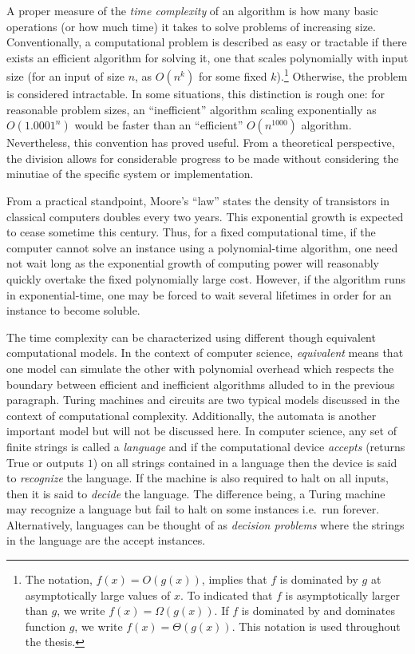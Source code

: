 \documentclass[11pt,oneside,final]{huthesis}%
\begin{document}
A proper measure of the \emph{time complexity} of an algorithm is how many basic operations (or how much time) it takes to solve problems of increasing size. Conventionally, a computational problem is described as easy or tractable if there exists an efficient algorithm for solving it, one that scales polynomially with input size (for an input of size $n$, as $O(n^k)$ for some fixed $k$).\footnote{The notation, $f(x)=O(g(x))$, implies that $f$ is dominated by $g$ at asymptotically large values of $x$.  To indicated that $f$ is asymptotically larger than $g$, we write $f(x)=\Omega(g(x))$.  If $f$ is dominated by and dominates function $g$, we write $f(x)=\Theta(g(x))$. This notation is used throughout the thesis.} Otherwise, the problem is considered intractable. In some situations, this distinction is rough one: for reasonable problem sizes, an ``inefficient'' algorithm scaling exponentially as $O(1.0001^n)$ would be faster than an ``efficient'' $O(n^{1000})$ algorithm. Nevertheless, this convention has proved useful. From a theoretical perspective, the division allows for considerable progress to be made without considering the minutiae of the specific system or implementation.

From a practical standpoint, Moore's ``law'' states the density of transistors in classical computers doubles every two years.  This exponential growth is expected to cease sometime this century.  Thus, for a fixed computational time, if the computer cannot solve an instance using a polynomial-time algorithm, one need not wait long as the exponential growth of computing power will reasonably quickly  overtake the fixed polynomially large cost.  However, if the algorithm runs in exponential-time, one may be forced to wait several lifetimes in order for an instance to become soluble.  



The time complexity can be characterized using different though equivalent computational models.  In the context of computer science, \emph{equivalent} means that one model can simulate the other with polynomial overhead which respects the boundary between efficient and inefficient algorithms alluded to in the previous paragraph.  Turing machines and circuits are two typical models discussed in the context of computational complexity.  Additionally, the automata is another important model but will not be discussed here.
In computer science, any set of finite strings is called a \emph{language} and if the computational device \emph{accepts} (returns True or outputs $1$) on all strings contained in a language then the device is said to \emph{recognize} the language.  If the machine is also required to halt on all inputs, then it is said to \emph{decide} the language. The difference being, a Turing machine may recognize a language but fail to halt on some instances i.e.~run forever. Alternatively, languages can be thought of as \emph{decision problems} where the strings in the language are the accept instances.
\end{document}
